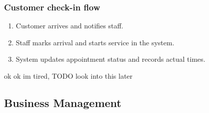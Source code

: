 \documentclass[]{VUMIFTemplateClass}
\begin{document}
\subsubsection{Customer check-in flow}
\begin{enumerate}
    \item Customer arrives and notifies staff.
    \item Staff marks arrival and starts service in the system.
    \item System updates appointment status and records actual times.
\end{enumerate}

ok ok im tired, TODO look into this later


% 


\subsection{Business Management}

\end{document}
